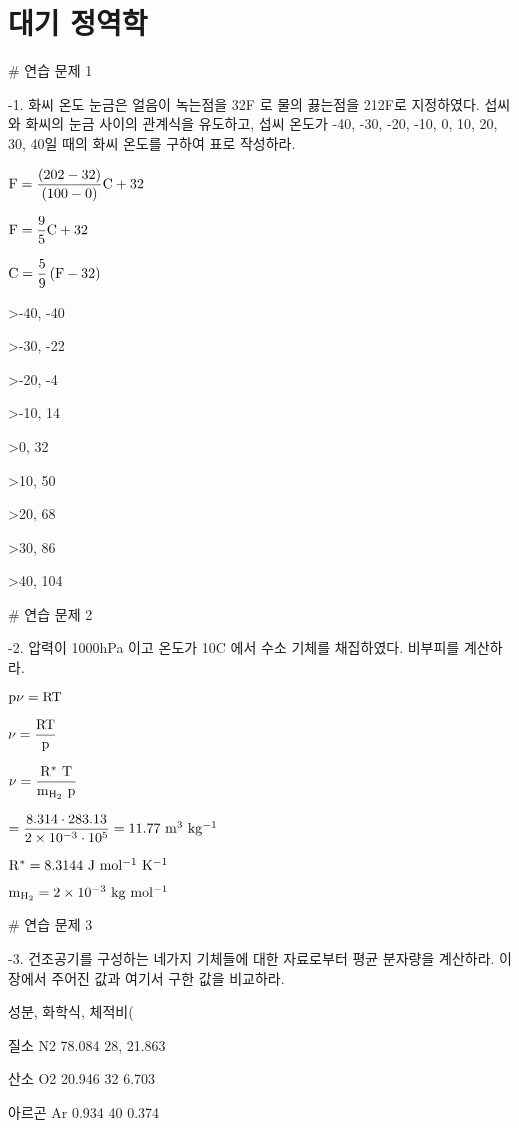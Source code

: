 \section{대기 정역학 }

\pagestyle{headings}

# 연습 문제 1


-1. 화씨 온도 눈금은 얼음이 녹는점을 32F 로 물의 끓는점을 212F로 지정하였다. 섭씨와 화씨의 눈금 사이의 관계식을 유도하고, 섭씨 온도가 -40, -30, -20,  -10, 0, 10, 20, 30, 40일 때의 화씨 온도를 구하여 표로 작성하라.

$ \rm F = \dfrac{(202-32)}{(100-0)} C + 32 $

$ \rm F = \dfrac{9}{5} C + 32$

$ \rm C = \dfrac{5}{9} \left( F - 32 \right)$

>-40,	-40

>-30,	-22

>-20,	-4

>-10,	14

>0,	32

>10,	50

>20,	68

>30,	86

>40,	104



# 연습 문제 2


-2. 압력이 1000hPa 이고 온도가 10C 에서 수소 기체를 채집하였다. 비부피를 계산하라.

$ \rm p  \nu = R T $

$ \rm \nu = \dfrac{R T}{p} $

$ \rm \nu = \dfrac{R^{*} ~T}{m_{H_{2}}~p} $

$ \rm = \dfrac{8.314 \cdot 283.13}{2 \times 10^{-3} \cdot 10^{5}} = 11.77 ~ m^{3}~kg^{-1} $

$ \rm R^{*} = 8.3144 ~J ~mol^{-1} ~K^{-1}$

$ \rm m_{H_{2}} = 2 \times 10^{-3} ~kg~mol^{-1} $




# 연습 문제 3


-3. 건조공기를 구성하는 네가지 기체들에 대한 자료로부터 평균 분자량을 계산하라. 이 장에서 주어진 값과 여기서 구한 값을 비교하라.

성분, 화학식, 체적비(%

질소	N2	78.084 28, 21.863

산소	O2	20.946	32 6.703

아르곤	Ar	0.934	40 0.374

